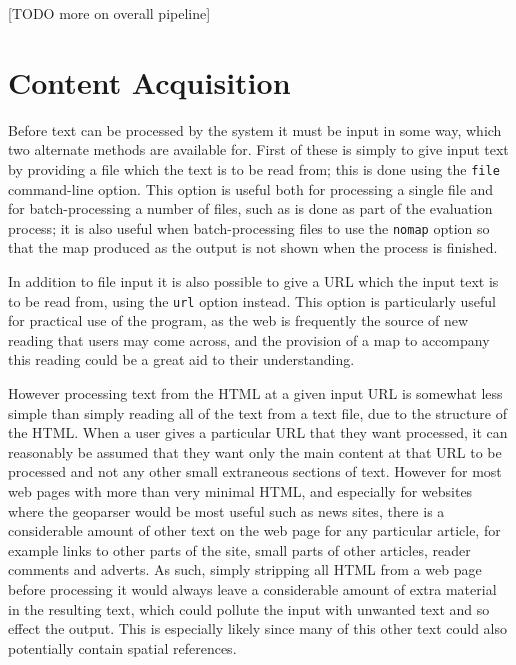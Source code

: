 \documentclass[12pt, a4paper]{report}
\begin{document}
[TODO more on overall pipeline]

\section{Content Acquisition}
\label{content_acquisition}

Before text can be processed by the system it must be input in some way, which two alternate methods are available for. First of these is simply to give input text by providing a file which the text is to be read from; this is done using the \verb#file# command-line option. This option is useful both for processing a single file and for batch-processing a number of files, such as is done as part of the evaluation process; it is also useful when batch-processing files to use the \verb#nomap# option so that the map produced as the output is not shown when the process is finished.

In addition to file input it is also possible to give a URL which the input text is to be read from, using the \verb#url# option instead. This option is particularly useful for practical use of the program, as the web is frequently the source of new reading that users may come across, and the provision of a map to accompany this reading could be a great aid to their understanding.

However processing text from the HTML at a given input URL is somewhat less simple than simply reading all of the text from a text file, due to the structure of the HTML. When a user gives a particular URL that they want processed, it can reasonably be assumed that they want only the main content at that URL to be processed and not any other small extraneous sections of text. However for most web pages with more than very minimal HTML, and especially for websites where the geoparser would be most useful such as news sites, there is a considerable amount of other text on the web page for any particular article, for example links to other parts of the site, small parts of other articles, reader comments and adverts. As such, simply stripping all HTML from a web page before processing it would always leave a considerable amount of extra material in the resulting text, which could pollute the input with unwanted text and so effect the output. This is especially likely since many of this other text could also potentially contain spatial references.
\end{document}

